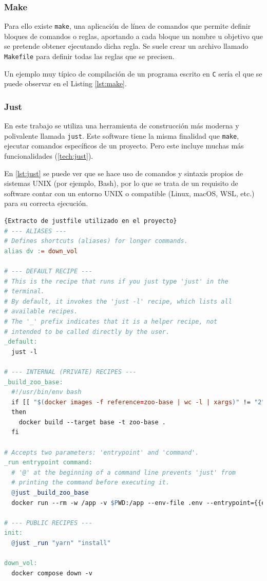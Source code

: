 \subsubsection*{Make}
\label{subsec:make}

Para ello existe \texttt{make}\cite{make}, una aplicación de línea de comandos que permite definir bloques de comandos o reglas, aportando a cada bloque un nombre u objetivo que se pretende obtener ejecutando dicha regla. Se suele crear un archivo llamado \texttt{Makefile} para definir todas las reglas que se precisen.

Un ejemplo muy típico de compilación de un programa escrito en \texttt{C} sería el que se puede observar en el Listing \ref{lst:make}.

\subsubsection*{Just}
\label{subsec:just}

En este trabajo se utiliza una herramienta de construcción más moderna y polivalente llamada \texttt{just}\cite{just}. Este software tiene la misma finalidad que \texttt{make}, ejecutar comandos específicos de un proyecto. Pero este incluye muchas más funcionalidades (\ref{tech:just}).

En \ref{lst:just} se puede ver que se hace uso de comandos y sintaxis propios de sistemas UNIX (por ejemplo, Bash), por lo que se trata de un requisito de software contar con un entorno UNIX o compatible (Linux, macOS, WSL, etc.) para su correcta ejecución.

\begin{lstlisting}[language=make,label=lst:just]{Extracto de justfile utilizado en el proyecto}
# --- ALIASES ---
# Defines shortcuts (aliases) for longer commands.
alias dv := down_vol

# --- DEFAULT RECIPE ---
# This is the recipe that runs if you just type 'just' in the
# terminal.
# By default, it invokes the 'just -l' recipe, which lists all
# available recipes.
# The '_' prefix indicates that it is a helper recipe, not
# intended to be called directly by the user.
_default:
  just -l

# --- INTERNAL (PRIVATE) RECIPES ---
_build_zoo_base:
  #!/usr/bin/env bash
  if [[ "$(docker images -f reference=zoo-base | wc -l | xargs)" != "2" ]]
  then
    docker build --target base -t zoo-base .
  fi

# Accepts two parameters: 'entrypoint' and 'command'.
_run entrypoint command:
  # '@' at the beginning of a command line prevents 'just' from
  # printing the command before executing it.
  @just _build_zoo_base
  docker run --rm -w /app -v $PWD:/app --env-file .env --entrypoint={{entrypoint}} zoo-base {{command}}

# --- PUBLIC RECIPES ---
init:
  @just _run "yarn" "install"

down_vol:
  docker compose down -v
\end{lstlisting}

